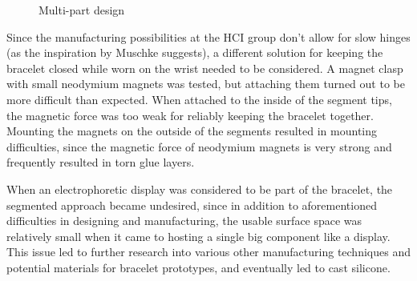 \begin{figure}[bth]
	\myfloatalign
	 \quad
	\caption{Multi-part design}
\end{figure}

Since the manufacturing possibilities at the \ac{HCI} group don't allow for slow hinges (as the inspiration by Muschke suggests), a different solution for keeping the bracelet closed while worn on the wrist needed to be considered. A magnet clasp with small neodymium magnets was tested, but attaching them turned out to be more difficult than expected. When attached to the inside of the segment tips, the magnetic force was too weak for reliably keeping the bracelet together. Mounting the magnets on the outside of the segments resulted in mounting difficulties, since the magnetic force of neodymium magnets is very strong and frequently resulted in torn glue layers.

When an electrophoretic display was considered to be part of the bracelet, the segmented approach became undesired, since in addition to aforementioned difficulties in designing and manufacturing, the usable surface space was relatively small when it came to hosting a single big component like a display. This issue led to further research into various other manufacturing techniques and potential materials for bracelet prototypes, and eventually led to cast silicone.

